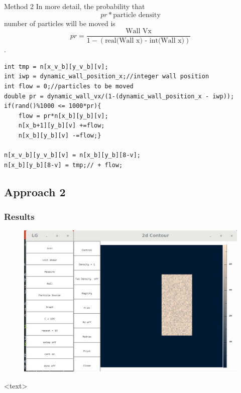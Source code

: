 \documentclass{beamer}
\begin{document}
\begin{frame}{Method 2}
In more detail, the probability that $$ pr * \textrm{particle density}$$ number of particles will be moved is $$pr = \frac{\textrm{Wall Vx}}{1-(\textrm{real(Wall x) - int(Wall x)})}$$.
\end{frame}


\begin{frame}[fragile]
\begin{lstlisting}
int tmp = n[x_v_b][y_v_b][v];
int iwp = dynamic_wall_position_x;//integer wall position
int flow = 0;//particles to be moved
double pr = dynamic_wall_vx/(1-(dynamic_wall_position_x - iwp));
if(rand()%1000 <= 1000*pr){
	flow = pr*n[x_b][y_b][v];
	n[x_b+1][y_b][v] +=flow;
	n[x_b][y_b][v] -=flow;}
			
n[x_v_b][y_v_b][v] = n[x_b][y_b][8-v];
n[x_b][y_b][8-v] = tmp;// + flow;	

\end{lstlisting}
\end{frame}

\subsection{Approach 2}
\begin{frame}
\frametitle{Results}
\begin{figure}
\includegraphics[scale=0.2]{A11p2}
\caption{}
\end{figure}
<text>
\end{frame}
\end{document}
